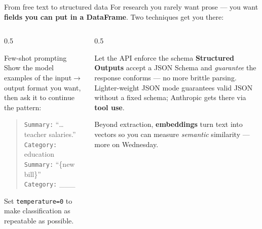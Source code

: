 \documentclass[9pt,aspectratio=169]{beamer}
\begin{document}
\begin{frame}{From free text to structured data}
    For research you rarely want prose --- you want \textbf{fields you can put in a DataFrame}. Two techniques get you there:
    \begin{columns}[T]
        \begin{column}{0.5\textwidth}
            \begin{block}{Few-shot prompting}
                \footnotesize Show the model examples of the input$\rightarrow$output format you want, then ask it to continue the pattern:
                \begin{quote}\scriptsize
                    \texttt{Summary:} ``\dots teacher salaries.''\\
                    \texttt{Category:} education\\[0.3em]
                    \texttt{Summary:} ``\{new bill\}''\\
                    \texttt{Category:} \_\_\_
                \end{quote}
                Set \texttt{temperature=0} to make classification as repeatable as possible.
            \end{block}
        \end{column}
        \begin{column}{0.5\textwidth}
            \begin{block}{Let the API enforce the schema}
                \footnotesize \textbf{Structured Outputs} accept a JSON Schema and \textit{guarantee} the response conforms --- no more brittle parsing. Lighter-weight JSON mode guarantees valid JSON without a fixed schema; Anthropic gets there via \textbf{tool use}.
            \end{block}
            \vspace{0.3em}
            {\footnotesize Beyond extraction, \textbf{embeddings} turn text into vectors so you can measure \textit{semantic} similarity --- more on Wednesday.}
        \end{column}
    \end{columns}
\end{frame}
\end{document}
